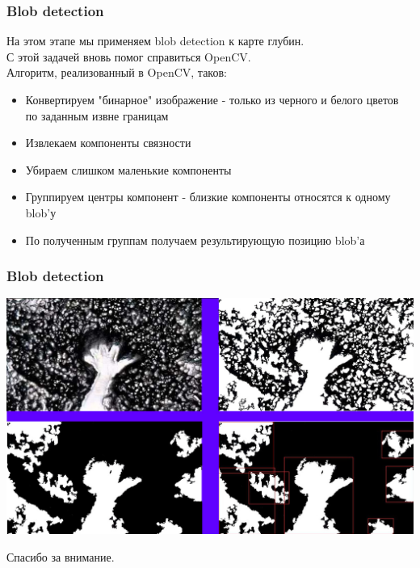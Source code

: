 \documentclass{beamer}
\begin{document}
		\begin{frame}
			\frametitle{Blob detection}
			
			На этом этапе мы применяем blob detection к карте глубин.\\
			С этой задачей вновь помог справиться OpenCV.\\
			Алгоритм, реализованный в OpenCV, таков:\\
			\begin{itemize}
				\item Конвертируем "бинарное" изображение - только
					  из черного и белого цветов по заданным извне границам
				\item Извлекаем компоненты связности
				\item Убираем слишком маленькие компоненты
				\item Группируем центры компонент - близкие компоненты относятся к одному 
				      blob'у
				\item По полученным группам получаем результирующую позицию blob'а
			\end{itemize}
		\end{frame}
		
		\begin{frame}
            \frametitle{Blob detection}		
		
			\begin{center}
				\includegraphics[scale=0.28]{images/blobDetectionPipeline}
			\end{center}
		\end{frame}
		
		\begin{frame}
		    \begin{center}
				Спасибо за внимание.
			\end{center}
		\end{frame}
\end{document}
